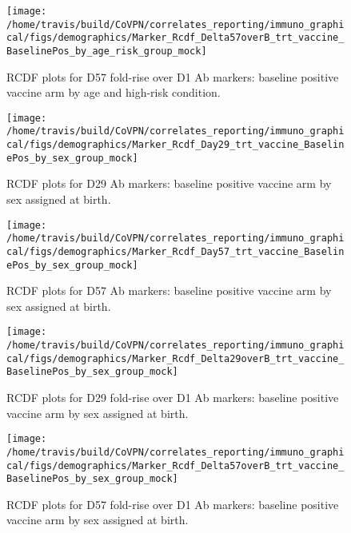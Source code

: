 \documentclass[]{book}
\theoremstyle{definition}
\theoremstyle{definition}
\theoremstyle{definition}
\newcommand{\1}{\mathbbm{1}}
\begin{document}
\begin{figure}[H]

{\centering \texttt{[image: /home/travis/build/CoVPN/correlates\_reporting/immuno\_graphical/figs/demographics/Marker\_Rcdf\_Delta57overB\_trt\_vaccine\_BaselinePos\_by\_age\_risk\_group\_mock]} 

}

\caption{RCDF plots for D57 fold-rise over D1 Ab markers: baseline positive vaccine arm by age and high-risk condition.}\label{fig:unnamed-chunk-103}
\end{figure}

\begin{figure}[H]

{\centering \texttt{[image: /home/travis/build/CoVPN/correlates\_reporting/immuno\_graphical/figs/demographics/Marker\_Rcdf\_Day29\_trt\_vaccine\_BaselinePos\_by\_sex\_group\_mock]} 

}

\caption{RCDF plots for D29 Ab markers: baseline positive vaccine arm by sex assigned at birth.}\label{fig:unnamed-chunk-104}
\end{figure}

\begin{figure}[H]

{\centering \texttt{[image: /home/travis/build/CoVPN/correlates\_reporting/immuno\_graphical/figs/demographics/Marker\_Rcdf\_Day57\_trt\_vaccine\_BaselinePos\_by\_sex\_group\_mock]} 

}

\caption{RCDF plots for D57 Ab markers: baseline positive vaccine arm by sex assigned at birth.}\label{fig:unnamed-chunk-105}
\end{figure}

\begin{figure}[H]

{\centering \texttt{[image: /home/travis/build/CoVPN/correlates\_reporting/immuno\_graphical/figs/demographics/Marker\_Rcdf\_Delta29overB\_trt\_vaccine\_BaselinePos\_by\_sex\_group\_mock]} 

}

\caption{RCDF plots for D29 fold-rise over D1 Ab markers: baseline positive vaccine arm by sex assigned at birth.}\label{fig:unnamed-chunk-106}
\end{figure}

\begin{figure}[H]

{\centering \texttt{[image: /home/travis/build/CoVPN/correlates\_reporting/immuno\_graphical/figs/demographics/Marker\_Rcdf\_Delta57overB\_trt\_vaccine\_BaselinePos\_by\_sex\_group\_mock]} 

}

\caption{RCDF plots for D57 fold-rise over D1 Ab markers: baseline positive vaccine arm by sex assigned at birth.}\label{fig:unnamed-chunk-107}
\end{figure}
\end{document}

